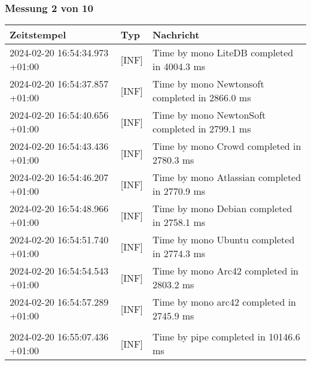     \subsubsection{Messung 2 von 10} \label{subsubsec:LiteDbWenigerPaketeAlsDb2von10}
        {
            {\small
                \begin{tabularx}{\textwidth}{|l|l|X|}
                    \hline
                    \textbf{Zeitstempel} & \textbf{Typ} & \textbf{Nachricht} \\
                    \hline
                    \endhead
                    2024-02-20 16:54:34.973 +01:00 & [INF] & Time by mono LiteDB completed in 4004.3 ms \\
                    2024-02-20 16:54:37.857 +01:00 & [INF] & Time by mono Newtonsoft completed in 2866.0 ms \\
                    2024-02-20 16:54:40.656 +01:00 & [INF] & Time by mono NewtonSoft completed in 2799.1 ms \\
                    2024-02-20 16:54:43.436 +01:00 & [INF] & Time by mono Crowd completed in 2780.3 ms \\
                    2024-02-20 16:54:46.207 +01:00 & [INF] & Time by mono Atlassian completed in 2770.9 ms \\
                    2024-02-20 16:54:48.966 +01:00 & [INF] & Time by mono Debian completed in 2758.1 ms \\
                    2024-02-20 16:54:51.740 +01:00 & [INF] & Time by mono Ubuntu completed in 2774.3 ms \\
                    2024-02-20 16:54:54.543 +01:00 & [INF] & Time by mono Arc42 completed in 2803.2 ms \\
                    2024-02-20 16:54:57.289 +01:00 & [INF] & Time by mono arc42 completed in 2745.9 ms \\
                    & & \\
                    2024-02-20 16:55:07.436 +01:00 & [INF] & Time by pipe completed in 10146.6 ms \\
                    \hline
                \end{tabularx}
            }
        }

